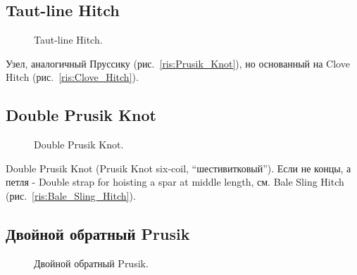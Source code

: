 \subsection{Taut-line Hitch}

\begin{figure}[H]\centering
	\begin{minipage}{1\linewidth}
		\begin{center}
			\tcbox[enhanced jigsaw,colframe=black,opacityframe=0.5,opacityback=0.5]
			{\centering{}}
		\end{center}
	\end{minipage}
\caption{Taut-line Hitch.}
\label{ris:Taut-line_Hitch}
\end{figure}

Узел, аналогичный Пруссику (рис.~\ref{ris:Prusik_Knot}), но основанный на Clove Hitch (рис.~\ref{ris:Clove_Hitch}).

\subsection{Double Prusik Knot}

\begin{figure}[H]\centering
	\begin{minipage}{1\linewidth}
		\begin{center}
			\tcbox[enhanced jigsaw,colframe=black,opacityframe=0.5,opacityback=0.5]
			{\centering{}}
		\end{center}
	\end{minipage}
\caption{Double Prusik Knot.}
\label{ris:Double_Prusik_Knot}
\end{figure}

Double Prusik Knot (Prusik Knot six-coil, \enquote{шестивитковый}). Если не концы, а петля - Double strap for hoisting a spar at middle length, см. Bale Sling Hitch (рис.~\ref{ris:Bale_Sling_Hitch}).

\subsection{Двойной обратный Prusik}

\begin{figure}[H]\centering
	\begin{minipage}{1\linewidth}
		\begin{center}
			\tcbox[enhanced jigsaw,colframe=black,opacityframe=0.5,opacityback=0.5]
			{\centering{}}
		\end{center}
	\end{minipage}
\caption{Двойной обратный Prusik.}
\label{ris:Double_Revers_Prusik}
\end{figure}

